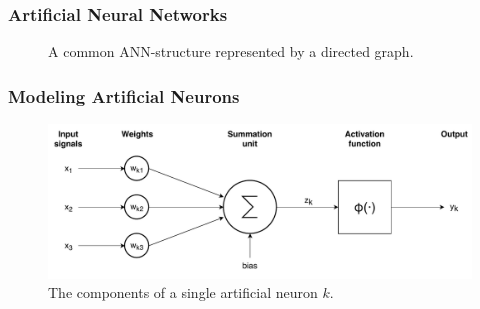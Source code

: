\begin{frame}
  \frametitle{Artificial Neural Networks}
  \begin{figure}
    \centering
    \resizebox{0.7\textwidth}{!}{}
    \caption{A common ANN-structure represented by a directed graph.}
  \end{figure}
\end{frame}


\begin{frame}
  \frametitle{Modeling Artificial Neurons}
  \begin{figure}
    \includegraphics[width=.9\textwidth]{../figures/single_neuron}
    \caption{The components of a single artificial neuron \(k\).}
  \end{figure}
\end{frame}

